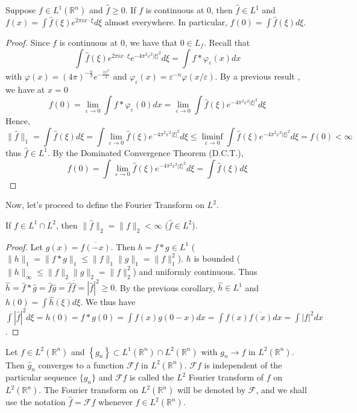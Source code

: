 \begin{corollary}
    Suppose $f \in L^1\left(\mathbb{R}^n\right)$ and $\hat{f} \geq 0$. If $f$ is continuous at 0, then $\hat{f} \in L^1$ and $f(x)=\int \hat{f}(\xi) e^{2 \pi i x \cdot \xi} d \xi$ almost everywhere. In particular, $f(0)=\int \hat{f}(\xi) d \xi$.
\end{corollary}
\begin{proof}
     Since $f$ is continuous at 0, we have that $0 \in L_f$. Recall that
$$
\int \hat{f}(\xi) e^{2 \pi i x \cdot \xi} e^{-4 \pi^2 \varepsilon^2 |\xi|^2} d \xi=\int f * \varphi_{\varepsilon}(x) dx
$$
with $\varphi(x)=(4 \pi)^{-\frac{n}{2}} e^{-\frac{|x|^2}{4}}$ and $\varphi_{\varepsilon}(x) = \varepsilon^{-n} \varphi(x/\varepsilon)$. By a previous result , we have at $x=0$
$$
f(0)=\lim _{\varepsilon \rightarrow 0} \int f * \varphi_{\varepsilon}(0) dx = \lim _{\varepsilon \rightarrow 0} \int \hat{f}(\xi) e^{-4 \pi^2 \varepsilon^2|\xi|^2} d \xi
$$
Hence,
$$
\|\hat{f}\|_1=\int \hat{f}(\xi) d\xi = \int \lim_{\varepsilon \rightarrow 0} \hat{f}(\xi) e^{-4 \pi^2 \varepsilon^2|\xi|^2} d \xi \leq \liminf _{\varepsilon \rightarrow 0} \int \hat{f}(\xi) e^{-4 \pi^2 \varepsilon^2|\xi|^2} d \xi=f(0)<\infty
$$
thus $\hat{f} \in L^1$. By the Dominated Convergence Theorem (D.C.T.), 
$$
f(0)=\int \lim _{\varepsilon \rightarrow 0} \hat{f}(\xi) e^{-4 \pi^2 \varepsilon^2|\xi|^2} d \xi=\int \hat{f}(\xi) d \xi
$$
\end{proof}
Now, let's proceed to define the Fourier Transform on $L^2$.
\begin{theorem}
    If $f \in L^1 \cap L^2$, then $\|\hat{f}\|_2=\|f\|_2<\infty$ ($\hat{f} \in L^2$).
\end{theorem}
\begin{proof}
    Let $g(x)=\overline{f(-x)}$. Then $h=f * g \in L^1$ ($\|h\|_1=\|f * g\|_1 \leq\|f\|_1\|g\|_1=\|f\|_1^2$).
$h$ is bounded ($\|h\|_{\infty} \leq\|f\|_2\|g\|_2 = \|f\|_2^2$) and uniformly continuous.
Thus $\hat{h}=\hat{f} * \hat{g}=\hat{f} \hat{g}=\hat{f} \overline{\hat{f}}=|\hat{f}|^2 \geq 0$.
By the previous corollary, $\hat{h} \in L^1$ and $h(0)=\int \hat{h}(\xi) d \xi$.
We thus have $\int|\hat{f}|^2 d\xi = h(0) = f * g(0) = \int f(x) g(0-x) dx = \int f(x) \overline{f(x)} dx = \int|f|^2 dx$.

\end{proof}
\begin{theorem}
    Let $f \in L^2(\mathbb{R}^n)$ and $\left\{g_n\right\} \subset L^1(\mathbb{R}^n) \cap L^2(\mathbb{R}^n)$ with $g_n \rightarrow f$ in $L^2(\mathbb{R}^n)$. Then $\hat{g}_n$ converges to a function $\mathcal{F}f$ in $L^2(\mathbb{R}^n)$. $\mathcal{F}f$ is independent of the particular sequence $\{g_n\}$ and $\mathcal{F}f$ is called the $L^2$ Fourier transform of $f$ on $L^2(\mathbb{R}^n)$.
The Fourier transform on $L^2(\mathbb{R}^n)$ will be denoted by $\mathcal{F}$, and we shall use the notation $\hat{f}=\mathcal{F}f$ whenever $f \in L^2(\mathbb{R}^n)$.
\end{theorem}
